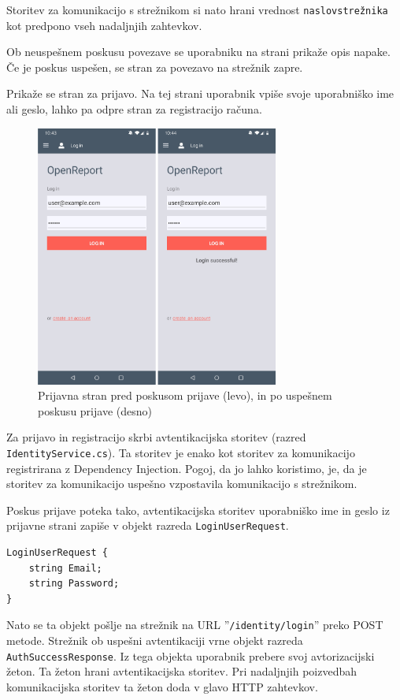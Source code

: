 \documentclass[a4paper, 12pt]{book}
\begin{document}
Storitev za komunikacijo s strežnikom si nato hrani vrednost \texttt{naslovstrežnika} kot predpono vseh nadaljnjih zahtevkov.

Ob neuspešnem poskusu povezave se uporabniku na strani prikaže opis napake.
Če je poskus uspešen, se stran za povezavo na strežnik zapre.

Prikaže se stran za prijavo.
Na tej strani uporabnik vpiše svoje uporabniško ime ali geslo, lahko pa odpre stran za registracijo računa.


\begin{figure}[H]
\begin{center}
\includegraphics[width=8cm]{app_login}
\end{center}
	\caption{Prijavna stran pred poskusom prijave (levo), in po uspešnem poskusu prijave (desno)}
\label{app_login}
\end{figure}


Za prijavo in registracijo skrbi avtentikacijska storitev (razred \\\texttt{IdentityService.cs}).
Ta storitev je enako kot storitev za komunikacijo registrirana z Dependency Injection.
Pogoj, da jo lahko koristimo, je, da je storitev za komunikacijo uspešno vzpostavila komunikacijo s strežnikom.

Poskus prijave poteka tako, avtentikacijska storitev uporabniško ime in geslo iz prijavne strani zapiše v objekt razreda \texttt{LoginUserRequest}.

\begin{Verbatim}[commandchars=+\[\]]
LoginUserRequest {
    string Email; 
    string Password;
}
\end{Verbatim}

Nato se ta objekt pošlje na strežnik na URL ''\texttt{/identity/login}'' preko POST metode.
Strežnik ob uspešni avtentikaciji vrne objekt razreda \texttt{AuthSuccessResponse}.
Iz tega objekta uporabnik prebere svoj avtorizacijski žeton.
Ta žeton hrani avtentikacijska storitev.
Pri nadaljnjih poizvedbah komunikacijska storitev ta žeton doda v glavo HTTP zahtevkov.
\end{document}
